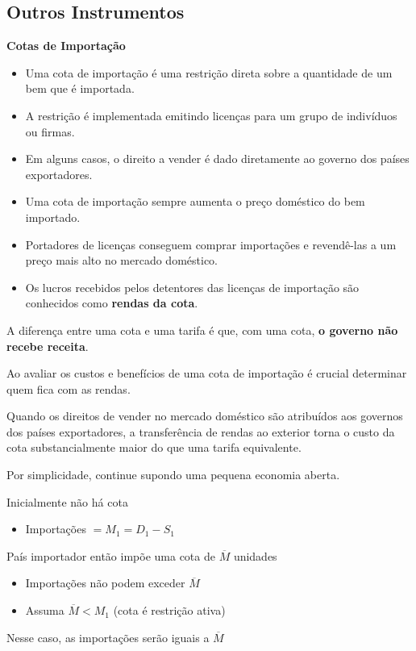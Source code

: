 \documentclass[a4paper,12pt]{article}[abntex2]
\begin{document}
\subsection{\textbf{Outros Instrumentos}}
\textbf{Cotas de Importação}
\begin{itemize}
  \item Uma cota de importação é uma restrição direta sobre a quantidade de um bem que é importada.
  \item A restrição é implementada emitindo licenças para um grupo de indivíduos ou firmas.
  \item Em alguns casos, o direito a vender é dado diretamente ao governo dos países exportadores.
  \item Uma cota de importação sempre aumenta o preço doméstico do bem importado.
  \item Portadores de licenças conseguem comprar importações e revendê-las a um preço mais alto no mercado doméstico.
  \item Os lucros recebidos pelos detentores das licenças de importação são conhecidos como \textbf{rendas da cota}.
\end{itemize}

A diferença entre uma cota e uma tarifa é que, com uma cota, \textbf{o governo não recebe receita}.

Ao avaliar os custos e benefícios de uma cota de importação é crucial determinar quem fica com as rendas.

Quando os direitos de vender no mercado doméstico são atribuídos aos governos dos países exportadores, a transferência de rendas ao exterior torna o custo da cota substancialmente maior do que uma tarifa equivalente.

Por simplicidade, continue supondo uma pequena economia aberta.

Inicialmente não há cota
\begin{itemize}
  \item Importações \( = M_1 = D_1 - S_1 \)
\end{itemize}

País importador então impõe uma cota de \( \overline{M} \) unidades
\begin{itemize}
  \item Importações não podem exceder \( \overline{M} \)
  \item Assuma \( \overline{M} < M_1 \) (cota é restrição ativa)
\end{itemize}

Nesse caso, as importações serão iguais a \( \overline{M} \)
\end{document}
